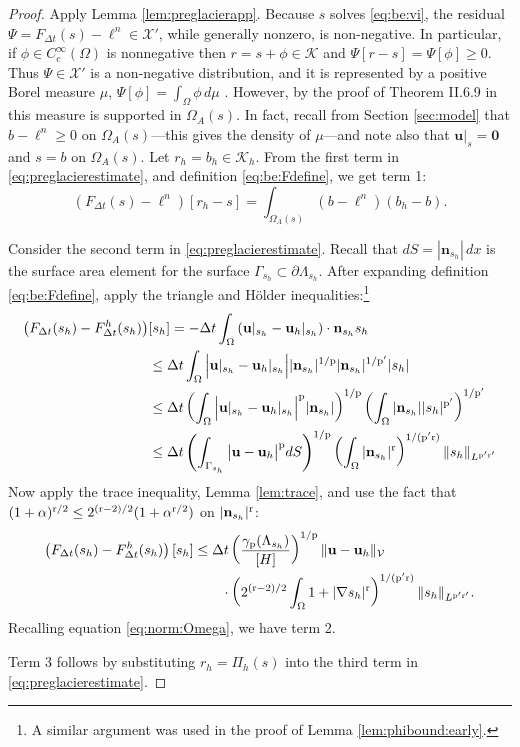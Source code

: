\documentclass[hidelinks,onefignum,onetabnum,final]{siamart220329}  %
\newcommand{\grad}{\nabla}
\newcommand{\bn}{\mathbf{n}}
\newcommand{\bu}{\mathbf{u}}
\newcommand{\bzero}{\bm{0}}
\newcommand{\cK}{\mathcal{K}}
\newcommand{\cV}{\mathcal{V}}
\newcommand{\cX}{\mathcal{X}}
\newcommand{\pp}{{\text{\textnormal{p}}}}
\newcommand{\rr}{{\text{\textnormal{r}}}}
\begin{document}
\begin{proof}  Apply Lemma \ref{lem:preglacierapp}.  Because $s$ solves \eqref{eq:be:vi}, the residual $\Psi = F_{\Delta t}(s)-\ell^n \in \cX'$, while generally nonzero, is non-negative.  In particular, if $\phi\in C_c^\infty(\Omega)$ is nonnegative then $r=s+\phi \in \cK$ and $\Psi[r-s] = \Psi[\phi] \ge 0$.  Thus $\Psi\in\cX'$ is a non-negative distribution, and it is represented by a positive Borel measure $\mu$, $\Psi[\phi] = \int_\Omega \phi\,d\mu$ \cite[Theorem 6.22]{LiebLoss1997}.  However, by the proof of Theorem II.6.9 in \cite{KinderlehrerStampacchia1980} this measure is supported in $\Omega_A(s)$.  In fact, recall from Section \ref{sec:model} that $b-\ell^n\ge 0$ on $\Omega_A(s)$---this gives the density of $\mu$---and note also that $\bu|_{s}=\bzero$ and $s=b$ on $\Omega_A(s)$.  Let $r_h = b_h \in \cK_h$.  From the first term in \eqref{eq:preglacierestimate}, and definition \eqref{eq:be:Fdefine}, we get term 1:
\begin{equation}
\left(F_{\Delta t}(s)-\ell^n\right)[r_h-s] = \int_{\Omega_A(s)} \left(b - \ell^n\right) (b_h - b).
\end{equation}

Consider the second term in \eqref{eq:preglacierestimate}.  Recall that $dS = |\bn_{s_h}|\,dx$ is the surface area element for the surface $\Gamma_{s_h} \subset \partial \Lambda_{s_h}$.  After expanding definition \eqref{eq:be:Fdefine}, apply the triangle and H\"older inequalities:\footnote{A similar argument was used in the proof of Lemma \ref{lem:phibound:early}.}
\begin{align}
\left(F_{\Delta t}(s_h)-F^h_{\Delta t}(s_h)\right)&[s_h] = - \Delta t \int_\Omega \left(\bu|_{s_h} - \bu_h|_{s_h}\right)\cdot \bn_{s_h} s_h  \\
  &\le \Delta t \int_\Omega \Big|\bu|_{s_h} - \bu_h|_{s_h}\Big| |\bn_{s_h}|^{1/\pp} |\bn_{s_h}|^{1/\pp'} |s_h| \notag \\
  &\le \Delta t \left(\int_\Omega \Big|\bu|_{s_h} - \bu_h|_{s_h}\Big|^\pp |\bn_{s_h}|\right)^{1/\pp} \left(\int_\Omega |\bn_{s_h}| |s_h|^{\pp'}\right)^{1/\pp'} \notag \\
  &\le \Delta t \left(\int_{\Gamma_{s_h}} \big|\bu - \bu_h\big|^\pp dS\right)^{1/\pp} \left(\int_\Omega |\bn_{s_h}|^\rr\right)^{1/(\pp'\rr)} \|s_h\|_{L^{\pp'\rr'}} \notag
\end{align}
Now apply the trace inequality, Lemma \ref{lem:trace}, and use the fact that $(1+\alpha)^{\rr/2} \le 2^{(\rr-2)/2} (1+\alpha^{\rr/2})$ on $|\bn_{s_h}|^\rr$:
\begin{align}
\left(F_{\Delta t}(s_h)-F^h_{\Delta t}(s_h)\right)[s_h] &\le \Delta t \left(\frac{\gamma_\pp(\Lambda_{s_h})}{[H]}\right)^{1/\pp} \|\bu - \bu_h\|_{\cV} \\
  &\qquad \cdot \left(2^{(\rr-2)/2} \int_\Omega 1 + |\grad s_h|^\rr\right)^{1/(\pp'\rr)} \|s_h\|_{L^{\pp'\rr'}}.  \notag
\end{align}
Recalling equation \eqref{eq:norm:Omega}, we have term 2.

Term 3 follows by substituting $r_h=\Pi_h(s)$ into the third term in \eqref{eq:preglacierestimate}.
\end{proof}
\end{document}
